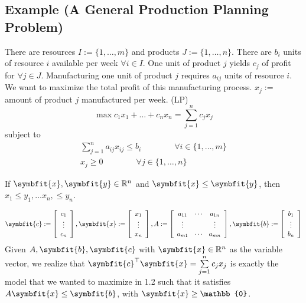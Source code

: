 \subsection{Example (A General Production Planning Problem)}
There are resources $I:=\{1,\dots,m\}$ and products $J:=\{1,\dots,n\}$. 
There are $b_i$ units of resource
$i$ available per week $\forall i\in I$. One unit of product $j$ yields $c_j$ of profit for
$\forall j\in J$. Manufacturing one unit of product $j$ requires $a_{ij}$ units of resource $i$.
We want to maximize the total profit of this manufacturing process.
$x_j :=$ amount of product $j$ manufactured per week. (LP)
\[\max c_1x_1 + \dots + c_nx_n = \sum\limits_{j=1}^n c_jx_j\]
subject to
\begin{align*}
    \sum\limits_{j=1}^n a_{ij}x_{ij}\le b_i \qquad\qquad\forall i\in\{1,\dots,m\}\\
    x_{j}\ge 0 \qquad\qquad\forall j\in\{1,\dots,n\}
\end{align*}

\begin{remark}
    If $\symbfit{x},\symbfit{y}\in\mathbb{R}^n$ and $\symbfit{x}\le \symbfit{y}$, then
    $x_1\le y_1, \dots x_n, \le y_n$.
\end{remark}

\begin{remark}
\[
\symbfit{c}:=\left[\begin{array}{c}{c_{1}} \\ {\vdots} \\ {c_{n}}\end{array}\right],
\symbfit{x}:=\left[\begin{array}{c}{x_{1}} \\ {\vdots} \\ {x_{n}}\end{array}\right],
A:=\left[\begin{array}{cccc}
    {a_{11}} & \cdots & {a_{1 n}} \\
    \vdots & & \vdots \\
     {a_{m 1}} & \cdots & {a_{m n}}
    \end{array}\right],
\symbfit{b}:=\left[\begin{array}{c}{b_{1}} \\ {\vdots} \\ {b_{n}}\end{array}\right]
\]
Given $A,\symbfit{b},\symbfit{c}$ with $\symbfit{x}\in\mathbb{R}^n$ as the variable vector, we realize that
$\symbfit{c}^\top  \symbfit{x}=\sum\limits_{j=1}^n c_jx_j$ is exactly the model that we wanted to maximize
in 1.2 such that it satisfies $A\symbfit{x}\le \symbfit{b}$, with $\symbfit{x}\ge \mathbb{0}$.
\end{remark}

